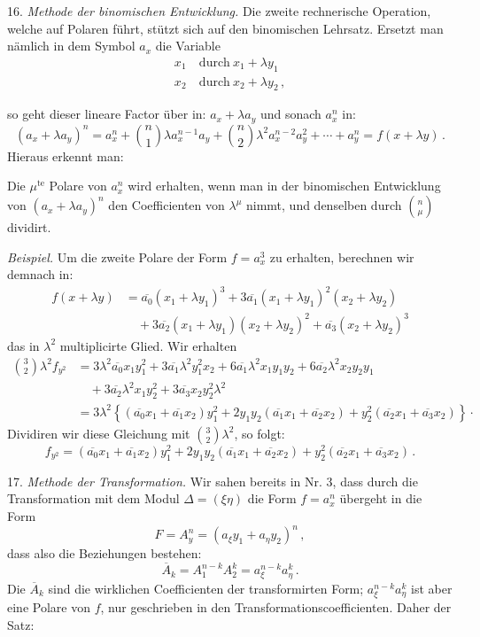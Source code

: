 16. \textit{Methode der binomischen Entwicklung.} Die zweite rechnerische Operation, welche auf Polaren führt, stützt sich auf den binomischen Lehrsatz. Ersetzt man nämlich in dem Symbol $a_x$ die Variable
\[
\begin{aligned}
x_1 &\ \text{durch}\ x_1+\lambda y_1\\
x_2 &\ \text{durch}\ x_2+\lambda y_2\,,
\end{aligned}
\]



so geht dieser lineare Factor über in: $a_x+\lambda a_y$ und sonach $a_x^n$ in:
\[ (a_x+\lambda a_y)^n = a_x^n+\binom{n}{1}\lambda a_x^{n-1}a_y+\binom{n}{2}\lambda^2a_x^{n-2}a_y^2+\cdots+a_y^n = f(x+\lambda y)\,. \]
Hieraus erkennt man:

\glqq Die $\mu^{\text{te}}$ Polare von $a_x^n$ wird erhalten, wenn man in der binomischen Entwicklung von $(a_x+\lambda a_y)^n$ den Coefficienten von $\lambda^\mu$ nimmt, und denselben durch $\binom{n}{\mu}$ dividirt.\grqq{}

\textit{Beispiel.} Um die zweite Polare der Form $f=a_x^3$ zu erhalten, berechnen wir demnach in:
\[
\begin{aligned}
f(x+\lambda y) &= \overline{a_0}(x_1+\lambda y_1)^3+3\overline{a_1}(x_1+\lambda y_1)^2(x_2+\lambda y_2)\\
&\quad+3\overline{a_2}(x_1+\lambda y_1)(x_2+\lambda y_2)^2+\overline{a_3}(x_2+\lambda y_2)^3
\end{aligned}
\]
das in $\lambda^2$ multiplicirte Glied. Wir erhalten
\[
\begin{aligned}
\binom{3}{2}\lambda^2f_{y^2} &= 3\lambda^2\overline{a_0}x_1y_1^2+3\overline{a_1}\lambda^2y_1^2x_2+6\overline{a_1}\lambda^2x_1y_1y_2+6\overline{a_2}\lambda^2x_2y_2y_1\\
&\quad+3\overline{a_2}\lambda^2x_1y_2^2+3\overline{a_3}x_2y_2^2\lambda^2\\
&= 3\lambda^2\left\{(\overline{a_0}x_1+\overline{a_1}x_2)y_1^2+2y_1y_2(\overline{a_1}x_1+\overline{a_2}x_2)+y_2^2(\overline{a_2}x_1+\overline{a_3}x_2)\right\}\cdot
\end{aligned}
\]
Dividiren wir diese Gleichung mit $\binom{3}{2}\lambda^2$, so folgt:
\[ f_{y^2} = (\overline{a_0}x_1+\overline{a_1}x_2)y_1^2+2y_1y_2(\overline{a_1}x_1+\overline{a_2}x_2)+y_2^2(\overline{a_2}x_1+\overline{a_3}x_2)\,. \]

17. \textit{Methode der Transformation.} Wir sahen bereits in Nr. 3, dass durch die Transformation
mit dem Modul $\Delta=(\xi\eta)$ die Form $f=a_x^n$ übergeht in die Form
\[ F = A_y^n = (a_\xi y_1+a_\eta y_2)^n\,, \]
dass also die Beziehungen bestehen:
\[ \overline{A}_k = A_1^{n-k}A_2^k = a_\xi^{n-k}a_\eta^k\,. \]
Die $\overline{A}_k$ sind die wirklichen Coefficienten der transformirten Form; $a_\xi^{n-k}a_\eta^k$ ist aber eine Polare von $f$, nur geschrieben in den Transformationscoefficienten. Daher der Satz:

